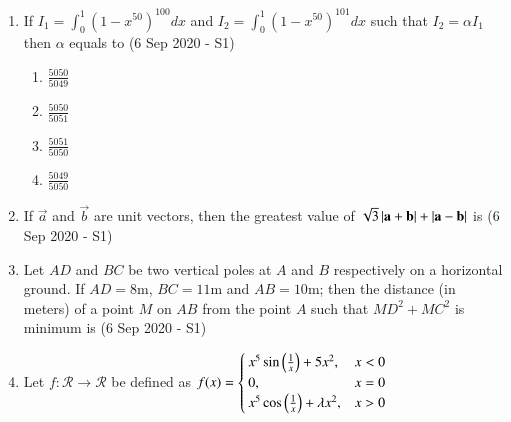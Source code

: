 \documentclass[journal]{IEEEtran}
\begin{document}
\begin{enumerate}
    \begin{multicols}{4}
    \begin{enumerate}
        \item $\frac{(t_1+t_2)}{2}$
        \item $2a(t_1+t_2)+b$
        \item $\frac{(t_2-t_1)}{2}$
        \item $a(t_2-t_1)+b$
    \end{enumerate}
    \end{multicols}
    
    \item If $I_1 = \int_{0}^{1}(1-x^{50})^{100} dx$ and $I_2 = \int_{0}^{1}(1-x^{50})^{101} dx$ such that $I_2 = \alpha I_1$ then $\alpha$ equals to \hfill (6 Sep 2020 - S1)
    
    \begin{multicols}{4}
    \begin{enumerate}
        \item $\frac{5050}{5049}$
        \item $\frac{5050}{5051}$
        \item $\frac{5051}{5050}$
        \item $\frac{5049}{5050}$
    \end{enumerate}
    \end{multicols}
    
    \item If $\vec{a}$ and $\vec{b}$ are unit vectors, then the greatest value of $\sqrt{3} \left\vert\mathbf{a} + \mathbf{b}\right\vert + \left\vert\mathbf{a} - \mathbf{b}\right\vert$ is \hfill (6 Sep 2020 - S1) \\
    
    \item Let $AD$ and $BC$ be two vertical poles at $A$ and $B$ respectively on a horizontal ground. If $AD = 8\text{m}$, $BC = 11\text{m}$ and $AB = 10\text{m}$; then the distance (in meters) of a point $M$ on $AB$ from the point $A$ such that $MD^2+MC^2$ is minimum is \hfill (6 Sep 2020 - S1)
    
    \item Let $f : \mathcal{R} \rightarrow \mathcal{R}$ be defined as $f(x)= \begin{cases}x^5\sin\left(\frac{1}{x}\right) + 5x^2,& x < 0 \\
    0,& x = 0\\
    x^5\cos\left(\frac{1}{x}\right) + \lambda x^2,& x > 0\end{cases}$\\
    

\end{enumerate}
\end{document}
